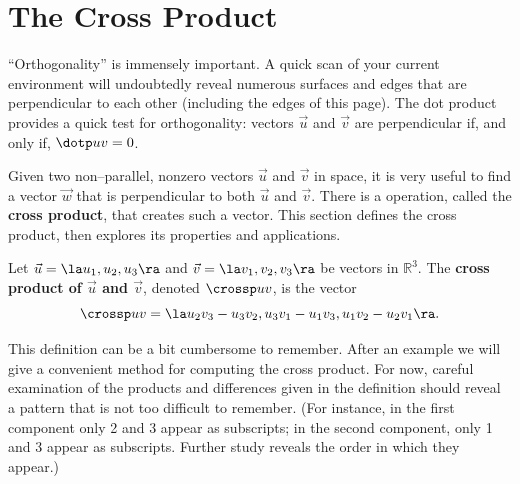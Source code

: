 \section{The Cross Product}\label{sec:cross_product}

``Orthogonality'' is immensely important. A quick scan of your current environment will undoubtedly reveal numerous surfaces and edges that are perpendicular to each other (including the edges of this page). The dot product provides a quick test for orthogonality:  vectors $\vec u$ and $\vec v$ are perpendicular if, and only if, $\dotp uv=0$. 

Given two non--parallel, nonzero vectors $\vec u$ and $\vec v$ in space, it is very useful to find a vector $\vec w$ that is perpendicular to both $\vec u$ and $\vec v$. There is a operation, called the \textbf{cross product}, that creates such a vector. This section defines the cross product, then explores its properties and applications.

{Let $\vec u =\la u_1,u_2,u_3\ra$ and $\vec v = \la v_1,v_2,v_3\ra$ be vectors in $\mathbb{R}^3$. The \textbf{cross product of $\vec u$ and $\vec v$}, denoted $\crossp uv$, is the vector
\[
\crossp uv = \la u_2v_3-u_3v_2,u_3v_1-u_1v_3,u_1v_2-u_2v_1\ra.
\]
}


This definition can be a bit cumbersome to remember. After an example we will give a convenient method for computing the cross product. For now, careful examination of the products and differences given in the definition should reveal a pattern that is not too difficult to remember. (For instance, in the first component only 2 and 3 appear as subscripts; in the second component, only 1 and 3 appear as subscripts. Further study reveals the order in which they appear.)

